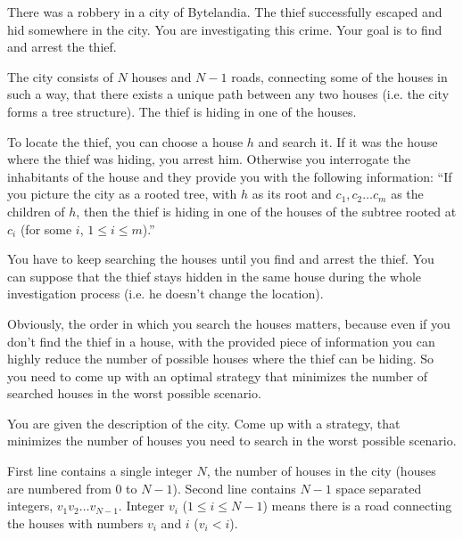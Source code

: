 





There was a robbery in a city of Bytelandia.
The thief successfully escaped and hid somewhere in the city.
You are investigating this crime. Your goal is to find and arrest the thief.

The city consists of $N$ houses and $N-1$ roads, connecting some of the houses in
such a way, that there exists a unique path between any two houses (i.e. the city forms a tree structure).
The thief is hiding in one of the houses.

To locate the thief, you can choose a house $h$ and search it.
If it was the house where the thief was hiding, you arrest him.
Otherwise you interrogate the inhabitants of the house and they provide you with the following information:
``If you picture the city as a rooted tree, with $h$ as its root and $c_1, c_2 \ldots c_m$ as the children of $h$,
then the thief is hiding in one of the houses of the subtree rooted at $c_i$ (for some $i$, $1 \leq i \leq m$).''

You have to keep searching the houses until you find and arrest the thief.
You can suppose that the thief stays hidden in the same house during the whole investigation process (i.e. he doesn't change the location).

Obviously, the order in which you search the houses matters, because even if you don't
find the thief in a house, with the provided piece of information you can highly reduce
the number of possible houses where the thief can be hiding.
So you need to come up with an optimal strategy that
minimizes the number of searched houses in the worst possible scenario.


You are given the description of the city.
Come up with a strategy, that minimizes the number
of houses you need to search in the worst possible scenario.


First line contains a single integer $N$, the number of houses in the city (houses are numbered from $0$ to $N-1$).
Second line contains $N-1$ space separated integers, $v_1 v_2 \ldots v_{N-1}$.
Integer $v_i$ ($1 \leq i \leq N-1$) means there is a road connecting the houses with numbers $v_i$ and $i$ ($v_i < i$).

